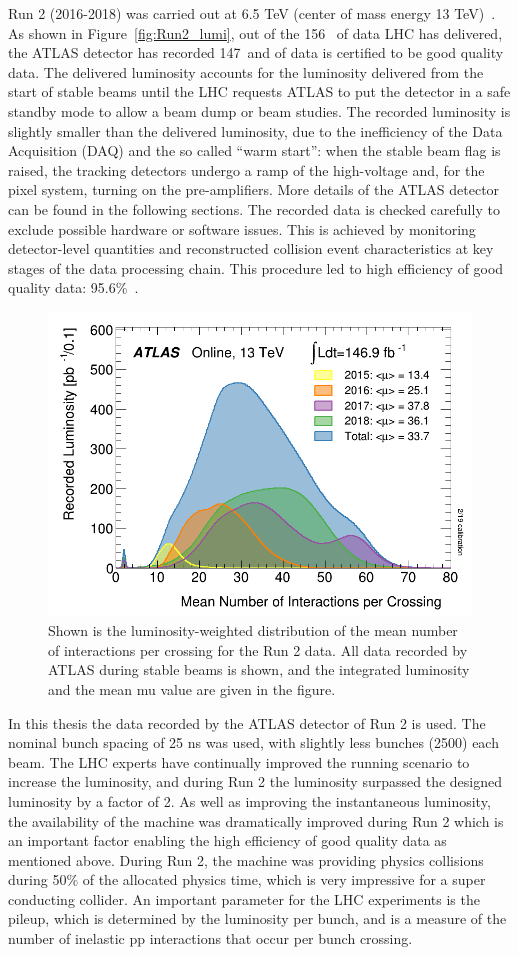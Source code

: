 \documentclass[letterpaper,12pt]{article}
\begin{document}
	Run 2 (2016-2018) was carried out
	at 6.5 TeV (center of mass energy 13 TeV)~\cite{LHC-Run2-Operation}. 
	As shown in Figure~\ref{fig:Run2_lumi}, out of the 156~\fb 
	of data LHC has delivered, the ATLAS detector has recorded 
	147~\fb and \lumi of data is certified to be good quality data.
	The delivered luminosity accounts for the luminosity delivered from the start of 
	stable beams until the LHC requests ATLAS to put the detector in a 
	safe standby mode to allow a beam dump or beam studies. 
	The recorded luminosity is slightly smaller than the delivered luminosity, due 
	to the inefficiency of the Data Acquisition (DAQ) and the so called ``warm start'': 
	when the stable beam flag is raised, 
	the tracking detectors undergo a ramp of the high-voltage and, 
	for the pixel system, turning on the pre-amplifiers. 
	More details of the ATLAS detector can be found in the following sections. 
	The recorded data is checked carefully to exclude possible hardware or software  issues. 
	This is achieved by monitoring detector-level quantities 
	and reconstructed collision event characteristics at key stages of the data processing chain.
	This procedure led to high efficiency of good quality data: 95.6\%~\cite{aad2020atlas}.	

	\begin{figure}[bht]
		\begin{centering}	
		\includegraphics[width=.4\textwidth]{Detector_plots/Run2_pileup.png}
		\caption{ Shown is the luminosity-weighted distribution of the mean number of 
		interactions per crossing for the Run 2 data. All data recorded by ATLAS during 
		stable beams is shown, and the integrated luminosity and 
		the mean mu value are given in the figure. 
			}
		\label{fig:Run2_pileup}
		\end{centering}
	\end{figure}

	In this thesis the \lumi data recorded by the ATLAS detector of Run 2 is used.
	The nominal bunch spacing of 25 ns was used, with slightly less bunches (2500) each beam.
	The LHC experts have continually improved the running scenario to increase the luminosity,
	and during Run 2 the luminosity surpassed the designed luminosity by a factor of 2. 
	As well as improving the instantaneous luminosity, the availability of the machine
	was dramatically improved during Run 2 which is an important factor enabling the high efficiency 
	of good quality data as mentioned above.
	During Run 2, the machine was providing physics collisions during 50\% of 
	the allocated physics time, which is very impressive for a super conducting collider. 
	An important parameter for the LHC experiments is the pileup, 
	which is determined by the luminosity per bunch, and is a measure of 
	the number of inelastic pp interactions that occur per bunch crossing. 
\end{document}
